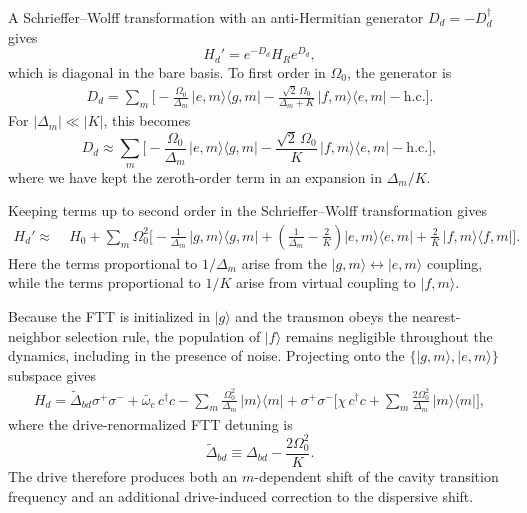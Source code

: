 A Schrieffer--Wolff transformation with an anti-Hermitian generator \(D_d=-D_d^\dagger\) gives
\begin{equation}
\label{eq:SWT_def}
H_d' = e^{-D_d}H_R e^{D_d},
\end{equation}
which is diagonal in the bare basis. To first order in \(\Omega_0\), the generator is
\begin{equation}
\label{eq:Dd_first_order}
\begin{aligned}
D_d=
\sum_{m}\Biggl[
-\frac{\Omega_0}{\Delta_m}\,|e,m\rangle\langle g,m|
-\frac{\sqrt{2}\,\Omega_0}{\Delta_m+K}\,|f,m\rangle\langle e,m|
-\mathrm{h.c.}
\Biggr] .
\end{aligned}
\end{equation}
For \(|\Delta_m|\ll |K|\), this becomes
\begin{equation}
\label{eq:Dd_first_order_approx}
D_d\approx
\sum_{m}\Biggl[
-\frac{\Omega_0}{\Delta_m}\,|e,m\rangle\langle g,m|
-\frac{\sqrt{2}\,\Omega_0}{K}\,|f,m\rangle\langle e,m|
-\mathrm{h.c.}
\Biggr],
\end{equation}
where we have kept the zeroth-order term in an expansion in \(\Delta_m/K\).

Keeping terms up to second order in the Schrieffer--Wolff transformation gives
\begin{align}
H_d' \approx\;& H_0
+ \sum_m \Omega_0^2\Biggl[
-\frac{1}{\Delta_m}\,|g,m\rangle\langle g,m|
+\left(\frac{1}{\Delta_m}-\frac{2}{K}\right) |e,m\rangle\langle e,m|
+\frac{2}{K}\,|f,m\rangle\langle f,m|
\Biggr].
\label{eq:Hd_second_order_explicit}
\end{align}
Here the terms proportional to \(1/\Delta_m\) arise from the \(|g,m\rangle\leftrightarrow |e,m\rangle\) coupling, while the terms proportional to \(1/K\) arise from virtual coupling to \(|f,m\rangle\).

Because the FTT is initialized in \(|g\rangle\) and the transmon obeys the nearest-neighbor selection rule, the population of \(|f\rangle\) remains negligible throughout the dynamics, including in the presence of noise. Projecting onto the \(\{|g,m\rangle,|e,m\rangle\}\) subspace gives
\begin{equation}
\label{eq:Hd_two_level}
\begin{aligned}
H_d=
\widetilde{\Delta}_{bd}\sigma^+\sigma^-
+\bar\omega_c\,c^\dagger c
-\sum_m \frac{\Omega_0^2}{\Delta_m}\,|m\rangle\langle m|  +\sigma^+\sigma^-\!\Biggl[
\chi\,c^\dagger c
+\sum_m \frac{2\Omega_0^2}{\Delta_m}\,|m\rangle\langle m|
\Biggr],
\end{aligned}
\end{equation}
where the drive-renormalized FTT detuning is
\[
\widetilde{\Delta}_{bd}\equiv \Delta_{bd}-\frac{2\Omega_0^2}{K}.
\]
The drive therefore produces both an \(m\)-dependent shift of the cavity transition frequency and an additional drive-induced correction to the dispersive shift. 

